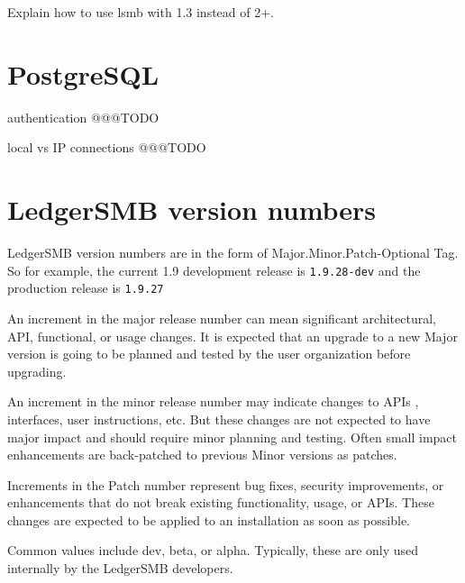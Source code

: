 Explain how to use lsmb with 1.3 instead of 2+.

\section{PostgreSQL}
\label{sec-global-config-postgresql}

\begin{description}[style=nextline]
\item [pg\_hba.conf] authentication @@@TODO 
\item [security] local vs IP connections @@@TODO 
 
\end{description}


\section{LedgerSMB version numbers}
\label{sec-global-config-ledgersmb-version-numbers}

LedgerSMB version numbers  are in the form of Major.Minor.Patch-Optional Tag. So for example, the current 1.9 development release is \texttt{1.9.28-dev} and the production release is \texttt{1.9.27}

\begin{description}[style=nextline]
\item [Major] An increment in the major release number  can mean significant architectural, \gls{API}, functional, or usage changes. It is expected that an upgrade to a new Major version is  going to be planned and tested by the user organization before upgrading.
\item [Minor] An increment in the minor release number may indicate changes to \glspl{API} , interfaces, user instructions, etc.  But these changes are not expected to have major impact and should require minor planning and testing. Often small impact enhancements are back-patched to previous Minor versions as patches.
\item [Patch] Increments in the Patch number represent bug fixes, security improvements, or enhancements that do not break existing functionality, usage, or \glspl{API}.  These changes are expected to be applied to an installation as soon as possible.
\item [Optional Tag] Common values include dev, beta, or alpha. Typically, these are only used internally by the LedgerSMB developers.
\end{description}

